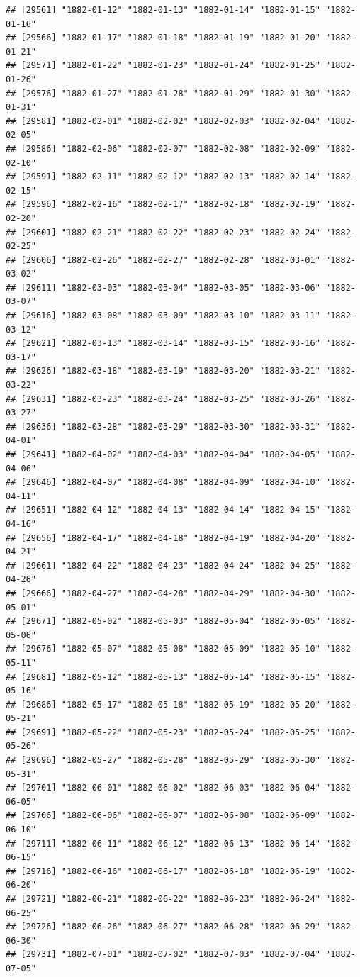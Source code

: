 \documentclass{article}\usepackage[]{graphicx}\usepackage[]{color}
\makeatletter
\newenvironment{kframe}{%
 \def\at@end@of@kframe{}%
 \ifinner\ifhmode%
  \def\at@end@of@kframe{\end{minipage}}%
  \begin{minipage}{\columnwidth}%
 \fi\fi%
 \def\FrameCommand##1{\hskip\@totalleftmargin \hskip-\fboxsep
 \colorbox{shadecolor}{##1}\hskip-\fboxsep
     \hskip-\linewidth \hskip-\@totalleftmargin \hskip\columnwidth}%
 \MakeFramed {\advance\hsize-\width
   \@totalleftmargin\z@ \linewidth\hsize
   \@setminipage}}%
 {\par\unskip\endMakeFramed%
 \at@end@of@kframe}
\newenvironment{knitrout}{}{} %
\makeatother
\begin{document}
\begin{description}
\begin{knitrout}
\begin{kframe}
\begin{verbatim}
## [29561] "1882-01-12" "1882-01-13" "1882-01-14" "1882-01-15" "1882-01-16"
## [29566] "1882-01-17" "1882-01-18" "1882-01-19" "1882-01-20" "1882-01-21"
## [29571] "1882-01-22" "1882-01-23" "1882-01-24" "1882-01-25" "1882-01-26"
## [29576] "1882-01-27" "1882-01-28" "1882-01-29" "1882-01-30" "1882-01-31"
## [29581] "1882-02-01" "1882-02-02" "1882-02-03" "1882-02-04" "1882-02-05"
## [29586] "1882-02-06" "1882-02-07" "1882-02-08" "1882-02-09" "1882-02-10"
## [29591] "1882-02-11" "1882-02-12" "1882-02-13" "1882-02-14" "1882-02-15"
## [29596] "1882-02-16" "1882-02-17" "1882-02-18" "1882-02-19" "1882-02-20"
## [29601] "1882-02-21" "1882-02-22" "1882-02-23" "1882-02-24" "1882-02-25"
## [29606] "1882-02-26" "1882-02-27" "1882-02-28" "1882-03-01" "1882-03-02"
## [29611] "1882-03-03" "1882-03-04" "1882-03-05" "1882-03-06" "1882-03-07"
## [29616] "1882-03-08" "1882-03-09" "1882-03-10" "1882-03-11" "1882-03-12"
## [29621] "1882-03-13" "1882-03-14" "1882-03-15" "1882-03-16" "1882-03-17"
## [29626] "1882-03-18" "1882-03-19" "1882-03-20" "1882-03-21" "1882-03-22"
## [29631] "1882-03-23" "1882-03-24" "1882-03-25" "1882-03-26" "1882-03-27"
## [29636] "1882-03-28" "1882-03-29" "1882-03-30" "1882-03-31" "1882-04-01"
## [29641] "1882-04-02" "1882-04-03" "1882-04-04" "1882-04-05" "1882-04-06"
## [29646] "1882-04-07" "1882-04-08" "1882-04-09" "1882-04-10" "1882-04-11"
## [29651] "1882-04-12" "1882-04-13" "1882-04-14" "1882-04-15" "1882-04-16"
## [29656] "1882-04-17" "1882-04-18" "1882-04-19" "1882-04-20" "1882-04-21"
## [29661] "1882-04-22" "1882-04-23" "1882-04-24" "1882-04-25" "1882-04-26"
## [29666] "1882-04-27" "1882-04-28" "1882-04-29" "1882-04-30" "1882-05-01"
## [29671] "1882-05-02" "1882-05-03" "1882-05-04" "1882-05-05" "1882-05-06"
## [29676] "1882-05-07" "1882-05-08" "1882-05-09" "1882-05-10" "1882-05-11"
## [29681] "1882-05-12" "1882-05-13" "1882-05-14" "1882-05-15" "1882-05-16"
## [29686] "1882-05-17" "1882-05-18" "1882-05-19" "1882-05-20" "1882-05-21"
## [29691] "1882-05-22" "1882-05-23" "1882-05-24" "1882-05-25" "1882-05-26"
## [29696] "1882-05-27" "1882-05-28" "1882-05-29" "1882-05-30" "1882-05-31"
## [29701] "1882-06-01" "1882-06-02" "1882-06-03" "1882-06-04" "1882-06-05"
## [29706] "1882-06-06" "1882-06-07" "1882-06-08" "1882-06-09" "1882-06-10"
## [29711] "1882-06-11" "1882-06-12" "1882-06-13" "1882-06-14" "1882-06-15"
## [29716] "1882-06-16" "1882-06-17" "1882-06-18" "1882-06-19" "1882-06-20"
## [29721] "1882-06-21" "1882-06-22" "1882-06-23" "1882-06-24" "1882-06-25"
## [29726] "1882-06-26" "1882-06-27" "1882-06-28" "1882-06-29" "1882-06-30"
## [29731] "1882-07-01" "1882-07-02" "1882-07-03" "1882-07-04" "1882-07-05"

\end{verbatim}
\end{kframe}
\end{knitrout}
\end{description}
\end{document}
